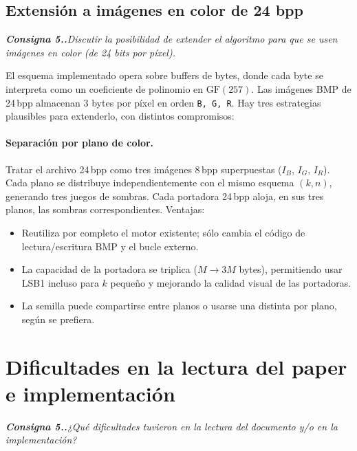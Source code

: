 \documentclass[11pt,a4paper]{article}
\newcommand{\pregunta}[1]{%
    \begingroup
    \itshape\small\color{gray!30!black}\textbf{Consigna 5.\arabic{section}.}\enspace #1\par\medskip
    \endgroup
}
\begin{document}
\subsection{Extensión a imágenes en color de 24 bpp}\label{sec:24bpp}
\pregunta{Discutir la posibilidad de extender el algoritmo para que se
usen imágenes en color (de 24 bits por píxel).}

El esquema implementado opera sobre buffers de bytes, donde cada byte se
interpreta como un coeficiente de polinomio en $\mathrm{GF}(257)$. Las
imágenes BMP de 24\,bpp almacenan 3 bytes por píxel en orden
\texttt{B, G, R}. Hay tres estrategias plausibles para extenderlo, con
distintos compromisos:

\paragraph{Separación por plano de color.}
Tratar el archivo 24\,bpp como tres imágenes 8\,bpp superpuestas
($I_B$, $I_G$, $I_R$). Cada plano se distribuye independientemente con
el mismo esquema $(k,n)$, generando tres juegos de sombras. Cada
portadora 24\,bpp aloja, en sus tres planos, las sombras
correspondientes. Ventajas:
\begin{itemize}[leftmargin=*,nosep]
    \item Reutiliza por completo el motor existente; sólo cambia el código
          de lectura/escritura BMP y el bucle externo.
    \item La capacidad de la portadora se triplica
          ($M \to 3M$ bytes), permitiendo usar LSB1 incluso para
          $k$ pequeño y mejorando la calidad visual de las portadoras.
    \item La semilla puede compartirse entre planos o usarse una distinta
          por plano, según se prefiera.
\end{itemize}

\section{Dificultades en la lectura del paper e implementación}\label{sec:dificultades}
\pregunta{¿Qué dificultades tuvieron en la lectura del documento y/o en
la implementación?}
\end{document}
